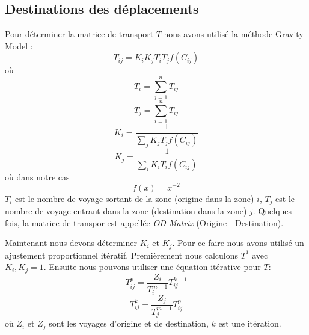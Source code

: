 \subsection{Destinations des déplacements}


Pour déterminer la matrice de transport $T$ nous avons utilisé la méthode Gravity Model :
$$T_{ij} = K_i K_j T_i T_j f(C_{ij})$$
où
$$T_i = \sum_{j = 1}^{n} T_{ij}$$
$$T_j = \sum_{i = 1}^{n} T_{ij}$$
$$K_i = \frac{1}{\sum_{j} K_j T_j f(C_{ij})}$$
$$K_j = \frac{1}{\sum_{i} K_i T_i f(C_{ij})}$$
où dans notre cas $$f(x) = x^{-2}$$
$T_i$ est le nombre de voyage sortant de la zone (origine dans la zone) $i$, $T_j$ est le nombre de voyage entrant dans la zone (destination dans la zone) $j$. Quelques fois, la matrice de transpor est appellée \textit{OD Matrix} (Origine - Destination).



Maintenant nous devons déterminer $K_i$ et $K_j$. Pour ce faire nous avons utilisé un ajustement proportionnel itératif. Premièrement nous calculons $T^1$ avec $K_i, K_j = 1$. Ensuite nous pouvons utiliser une équation itérative pour $T$:
$$T_{ij}^{p} = \frac{Z_i}{T_i^{m-1}} T_{ij}^{k-1}$$
$$T_{ij}^{k} = \frac{Z_j}{T_j^{m-1}} T_{ij}^{p}$$
où $Z_i$ et $Z_j$ sont les voyages d'origine et de destination, $k$ est une itération.

